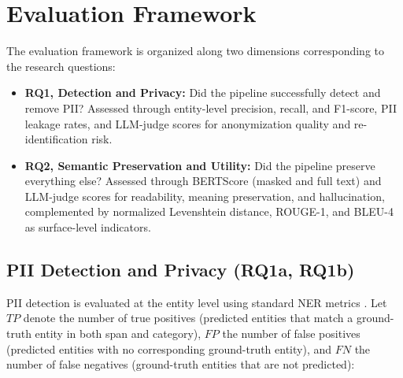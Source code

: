 \section{Evaluation Framework}
\label{sec:evaluation}

The evaluation framework is organized along two dimensions corresponding to
the research questions:

\begin{itemize}
    \item \textbf{RQ1, Detection and Privacy:} Did the pipeline successfully
    detect and remove PII? Assessed through entity-level precision, recall, and
    F1-score, PII leakage rates, and LLM-judge scores for anonymization quality
    and re-identification risk.

    \item \textbf{RQ2, Semantic Preservation and Utility:} Did the pipeline
    preserve everything else? Assessed through BERTScore (masked and
    full text) and LLM-judge scores for readability, meaning
    preservation, and hallucination, complemented by normalized
    Levenshtein distance, ROUGE-1, and BLEU-4 as surface-level
    indicators.
\end{itemize}


\subsection{PII Detection and Privacy (RQ1a, RQ1b)}
\label{sec:eval_detection}

PII detection is evaluated at the entity level using standard NER metrics
\citep{pilan2022tab, altalla2025evaluating}. Let $\mathit{TP}$ denote the
number of true positives (predicted entities that match a ground-truth
entity in both span and category), $\mathit{FP}$ the number of false
positives (predicted entities with no corresponding ground-truth
entity), and $\mathit{FN}$ the number of false negatives (ground-truth
entities that are not predicted):

